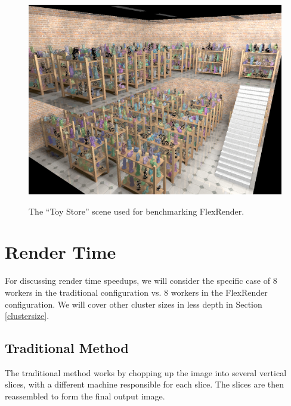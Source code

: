 \documentclass[12pt]{ucthesis}
\newcommand{\captionfonts}{\small\bf\ssp}
\begin{document}
\begin{figure}[h!]
    \centering
    \includegraphics[width=140mm]{images/toystore.png}
    \captionfonts
    \caption{The ``Toy Store'' scene used for benchmarking FlexRender.}
    \label{fig:toystore}
\end{figure}

\section{Render Time}
\label{rendertime}

For discussing render time speedups, we will consider the specific case of 8
workers in the traditional configuration vs. 8 workers in the FlexRender
configuration. We will cover other cluster sizes in less depth in Section
\ref{clustersize}.

\subsection{Traditional Method}
\label{toystoretraditional}

The traditional method works by chopping up the image into several vertical
slices, with a different machine responsible for each slice. The slices are
then reassembled to form the final output image.
\end{document}
